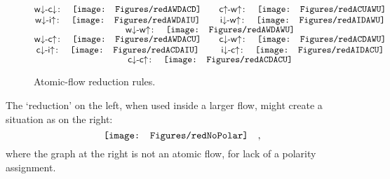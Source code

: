 \newcommand{\rwdcd}{{{\mathsf w}{\downarrow}{\hbox{-}}{\mathsf c}{\downarrow}}}
\newcommand{\rwdiu}{{{\mathsf w}{\downarrow}{\hbox{-}}{\mathsf i}{\uparrow  }}}
\newcommand{\rwdwu}{{{\mathsf w}{\downarrow}{\hbox{-}}{\mathsf w}{\uparrow  }}}
\newcommand{\rwdcu}{{{\mathsf w}{\downarrow}{\hbox{-}}{\mathsf c}{\uparrow  }}}
\newcommand{\rcuwu}{{{\mathsf c}{\uparrow  }{\hbox{-}}{\mathsf w}{\uparrow  }}}
\newcommand{\rcdwu}{{{\mathsf c}{\downarrow}{\hbox{-}}{\mathsf w}{\uparrow  }}}
\newcommand{\rcdiu}{{{\mathsf c}{\downarrow}{\hbox{-}}{\mathsf i}{\uparrow  }}}
\newcommand{\rcdcu}{{{\mathsf c}{\downarrow}{\hbox{-}}{\mathsf c}{\uparrow  }}}
\newcommand{\ridwu}{{{\mathsf i}{\downarrow}{\hbox{-}}{\mathsf w}{\uparrow  }}}
\newcommand{\ridcu}{{{\mathsf i}{\downarrow}{\hbox{-}}{\mathsf c}{\uparrow  }}}
\begin{figure}[tbp]
\[
\begin{array}{@{}c@{}c@{}}
\rwdcd\colon\quad
\vcenter{\hbox{\texttt{[image: Figures/redAWDACD]}}}
&\qquad
\rcuwu\colon\quad
\vcenter{\hbox{\texttt{[image: Figures/redACUAWU]}}}
\\
\rwdiu\colon\quad
\vcenter{\hbox{\texttt{[image: Figures/redAWDAIU]}}}
&\qquad
\ridwu\colon\quad
\vcenter{\hbox{\texttt{[image: Figures/redAIDAWU]}}}
\\
\multispan2{\hfil$
\rwdwu\colon\quad
\vcenter{\hbox{\texttt{[image: Figures/redAWDAWU]}}}
$\hfil}\\
\rwdcu\colon\quad
\vcenter{\hbox{\texttt{[image: Figures/redAWDACU]}}}
&\qquad
\rcdwu\colon\quad
\vcenter{\hbox{\texttt{[image: Figures/redACDAWU]}}}
\\
\rcdiu\colon\quad
\vcenter{\hbox{\texttt{[image: Figures/redACDAIU]}}}
&\qquad
\ridcu\colon\quad
\vcenter{\hbox{\texttt{[image: Figures/redAIDACU]}}}
\\
\multispan2{\hfil$
\rcdcu\colon\quad
\vcenter{\hbox{\texttt{[image: Figures/redACDACU]}}}
$\hfil}\\
\end{array}
\]
\caption{Atomic-flow reduction rules.}
\label{figure:ReductionRules}
\end{figure}%

\begin{example}\label{example:NoPolarityAssignment}
The `reduction' on the left, when used inside a larger flow, might create a situation as on the right:
\nopagebreak[4]\medskip\afnegspace
\[
\vcenter{\hbox{\texttt{[image: Figures/redNoPolar]}}}
\quad,
\] 
where the graph at the right is not an atomic flow, for lack of a polarity assignment.
\end{example}

